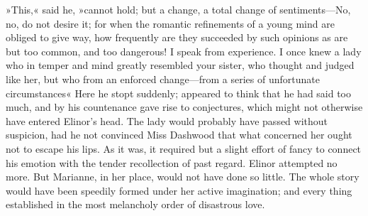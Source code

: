 »This,« said he, »cannot hold; but a change, a total change of sentiments—No, no, do not desire it; for when the romantic refinements of a young mind are obliged to give way, how frequently are they succeeded by such opinions as are but too common, and too dangerous! I speak from experience. I once knew a lady who in temper and mind greatly resembled your sister, who thought and judged like her, but who from an enforced change—from a series of unfortunate circumstances\longdash« Here he stopt suddenly; appeared to think that he had said too much, and by his countenance gave rise to conjectures, which might not otherwise have entered Elinor’s head. The lady would probably have passed without suspicion, had he not convinced Miss Dashwood that what concerned her ought not to escape his lips. As it was, it required but a slight effort of fancy to connect his emotion with the tender recollection of past regard. Elinor attempted no more. But Marianne, in her place, would not have done so little. The whole story would have been speedily formed under her active imagination; and every thing established in the most melancholy order of disastrous love.